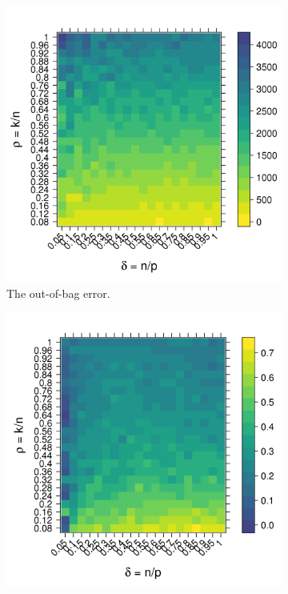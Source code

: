 \documentclass[11pt]{article}
\begin{document}
\begin{figure}[tbhp] 
  \begin{subfigure}[t]{0.5\linewidth}
    \centering
    \includegraphics[totalheight=6cm]{./figs/ranger_error_Stodden_simulation.png}
    \caption{The out-of-bag error.}
    \label{figure:ranger_error_Stodden_simulation.png}
    \vspace{4ex}
  \end{subfigure} 
  \begin{subfigure}[t]{0.5\linewidth}
    \centering
    \includegraphics[totalheight=6cm]{./figs/ranger_rbo_Stodden_simulation.png}

\end{subfigure}
\end{figure}
\end{document}
